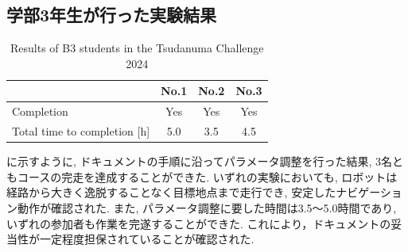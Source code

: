\subsection{学部3年生が行った実験結果}
\begin{table}[htbp]
  \centering
  \caption{Results of B3 students in the Tsudanuma Challenge 2024}
  \label{tab:b3_results}
  \begin{tabular}{lccc}
    \hline
     & \textbf{No.1} & \textbf{No.2} & \textbf{No.3} \\
    \hline
    Completion & Yes & Yes & Yes \\
    Total time to completion [h] & 5.0 & 3.5 & 4.5 \\
    \hline
  \end{tabular}
\end{table}
に示すように, ドキュメントの手順に沿ってパラメータ調整を行った結果, 3名ともコースの完走を達成することができた. 
いずれの実験においても, ロボットは経路から大きく逸脱することなく目標地点まで走行でき, 安定したナビゲーション動作が確認された. 
また, パラメータ調整に要した時間は3.5〜5.0時間であり, いずれの参加者も作業を完遂することができた. 
これにより，ドキュメントの妥当性が一定程度担保されていることが確認された. 


